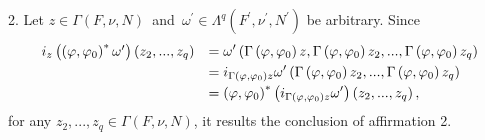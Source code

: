 \documentclass[11pt]{article}
\begin{document}
2. Let $z\in \Gamma \left( F,\nu ,N\right) $\emph{\ }and\emph{\ }$\omega
^{\prime }\in \Lambda ^{q}\left( F^{\prime },\nu ^{\prime },N^{\prime
}\right) $ be arbitrary. Since
\begin{equation*}
\begin{array}{ll}
i_{z}\left( \left( \varphi ,\varphi _{0}\right) ^{\ast }\omega ^{\prime
}\right) \left( z_{2},...,z_{q}\right) & \displaystyle =\omega ^{\prime
}\left( \Gamma \left( \varphi ,\varphi _{0}\right) z,\Gamma \left( \varphi
,\varphi _{0}\right) z_{2},...,\Gamma \left( \varphi ,\varphi _{0}\right)
z_{q}\right) \vspace*{1mm} \\
& \displaystyle=i_{\Gamma \left( \varphi ,\varphi _{0}\right) z}\omega
^{\prime }\left( \Gamma \left( \varphi ,\varphi _{0}\right) z_{2},...,\Gamma
\left( \varphi ,\varphi _{0}\right) z_{q}\right) \vspace*{1mm} \\
& \displaystyle=\left( \varphi ,\varphi _{0}\right) ^{\ast }\left( i_{\Gamma
\left( \varphi ,\varphi _{0}\right) z}\omega ^{\prime }\right) \left(
z_{2},...,z_{q}\right) ,%
\end{array}%
\end{equation*}%
for any $z_{2},...,z_{q}\in \Gamma \left( F,\nu ,N\right) $, it results the
conclusion of affirmation 2$.$\smallskip
\end{document}
